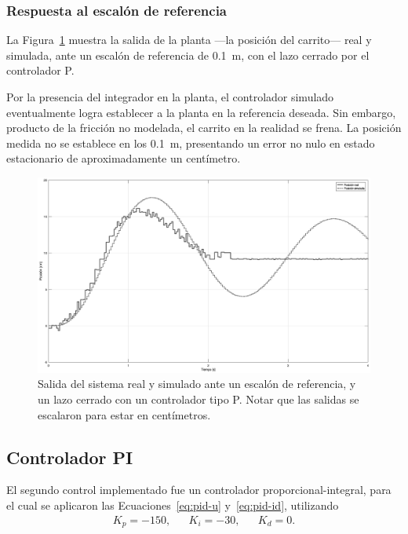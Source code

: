 \subsubsection{Respuesta al escalón de referencia}

La Figura~\ref{fig:p-ref-salida} muestra la salida de la planta ---la posición del carrito--- real y simulada, ante un escalón de referencia de \qty{0.1}{\m}, con el lazo cerrado por el controlador P.

Por la presencia del integrador en la planta, el controlador simulado eventualmente logra establecer a la planta en la referencia deseada. Sin embargo, producto de la fricción no modelada, el carrito en la realidad se frena. La posición medida no se establece en los \qty{0.1}{\m}, presentando un error no nulo en estado estacionario de aproximadamente un centímetro.

\begin{figure}[!tbp]
    \centering
    \includegraphics[width=\linewidth]{img/p-ref-salida.eps}
    \caption{Salida del sistema real y simulado ante un escalón de referencia, y un lazo cerrado con un controlador tipo P. Notar que las salidas se escalaron para estar en centímetros.}
    \label{fig:p-ref-salida}
\end{figure}

\subsection{Controlador PI}

El segundo control implementado fue un controlador proporcional-integral, para el cual se aplicaron las Ecuaciones~\eqref{eq:pid-u} y~\eqref{eq:pid-id}, utilizando
\begin{align*}
    K_p = -150, && K_i = -30, && K_d = 0.
\end{align*}

